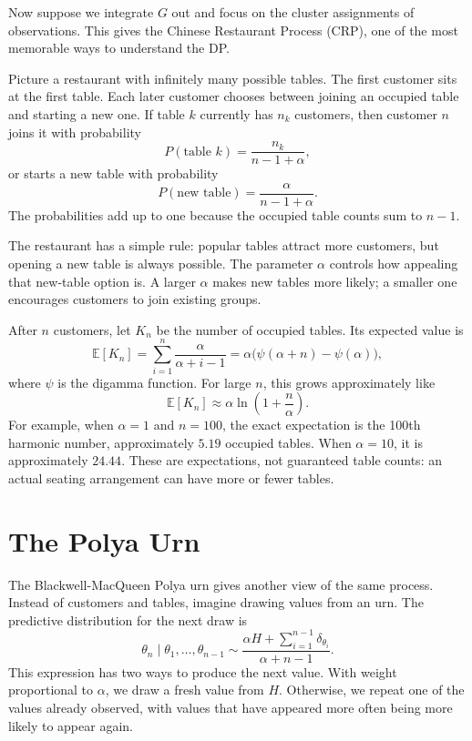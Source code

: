 \documentclass[11pt]{article}
\begin{document}
Now suppose we integrate \(G\) out and focus on the cluster assignments of observations. This gives the Chinese Restaurant Process (CRP), one of the most memorable ways to understand the DP.

Picture a restaurant with infinitely many possible tables. The first customer sits at the first table. Each later customer chooses between joining an occupied table and starting a new one. If table \(k\) currently has \(n_k\) customers, then customer \(n\) joins it with probability
\[
P(\text{table }k)
=
\frac{n_k}{n-1+\alpha},
\]
or starts a new table with probability
\[
P(\text{new table})
=
\frac{\alpha}{n-1+\alpha}.
\]
The probabilities add up to one because the occupied table counts sum to \(n-1\).

The restaurant has a simple rule: popular tables attract more customers, but opening a new table is always possible. The parameter \(\alpha\) controls how appealing that new-table option is. A larger \(\alpha\) makes new tables more likely; a smaller one encourages customers to join existing groups.

After \(n\) customers, let \(K_n\) be the number of occupied tables. Its expected value is
\[
\mathbb{E}[K_n]
=
\sum_{i=1}^{n}\frac{\alpha}{\alpha+i-1}
=
\alpha\bigl(\psi(\alpha+n)-\psi(\alpha)\bigr),
\]
where \(\psi\) is the digamma function. For large \(n\), this grows approximately like
\[
\mathbb{E}[K_n]\approx
\alpha\ln\left(1+\frac{n}{\alpha}\right).
\]
For example, when \(\alpha=1\) and \(n=100\), the exact expectation is the 100th harmonic number, approximately \(5.19\) occupied tables. When \(\alpha=10\), it is approximately \(24.44\). These are expectations, not guaranteed table counts: an actual seating arrangement can have more or fewer tables.

\section*{The Polya Urn}

The Blackwell-MacQueen Polya urn gives another view of the same process. Instead of customers and tables, imagine drawing values from an urn. The predictive distribution for the next draw is
\[
\theta_n\mid\theta_1,\ldots,\theta_{n-1}
\sim
\frac{\alpha H+\sum_{i=1}^{n-1}\delta_{\theta_i}}
{\alpha+n-1}.
\]
This expression has two ways to produce the next value. With weight proportional to \(\alpha\), we draw a fresh value from \(H\). Otherwise, we repeat one of the values already observed, with values that have appeared more often being more likely to appear again.
\end{document}
